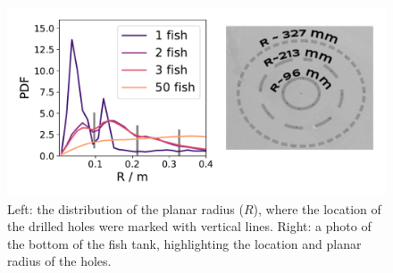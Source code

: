 \documentclass[11pt,twoside]{report}
\begin{document}
\begin{figure}
  \includegraphics[width=\linewidth]{density-hole}
  \caption[The effect of drilled holes on the tank on the spatial distribution of the fish.]{
  	Left: the distribution of the planar radius ($R$), where the location of the drilled holes were marked with vertical lines.
  	Right: a photo of the bottom of the fish tank, highlighting the location and planar radius of the holes.
  }
  \label{fig:density-holes}
\end{figure}

\vfill
\pagebreak

%
%
\end{document}
